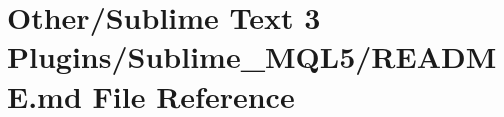 \hypertarget{_other_2_sublime_01_text_013_01_plugins_2_sublime___m_q_l5_2_r_e_a_d_m_e_8md}{}\section{Other/\+Sublime Text 3 Plugins/\+Sublime\+\_\+\+M\+Q\+L5/\+R\+E\+A\+D\+ME.md File Reference}
\label{_other_2_sublime_01_text_013_01_plugins_2_sublime___m_q_l5_2_r_e_a_d_m_e_8md}
